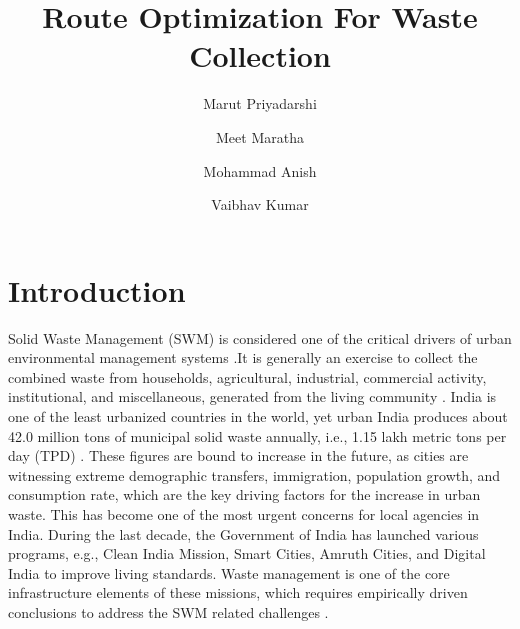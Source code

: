\documentclass[12pt]{article}
\begin{document}

\title{Route Optimization For Waste Collection\\}
\date{}
\author[1]{Marut Priyadarshi}
\author[2]{Meet Maratha}
\author[3]{Mohammad Anish}
\author[4]{Vaibhav Kumar}

\maketitle

\section{Introduction}

Solid Waste Management (SWM) is considered one of the critical drivers of urban environmental management systems \cite{hoornweg2012waste}.It is generally an exercise to collect the combined waste from households, agricultural, industrial, commercial activity, institutional, and miscellaneous, generated from the living community \cite{GUPTA2015206}. India is one of the least urbanized countries in the world, yet urban India produces about 42.0 million tons of municipal solid waste annually, i.e., 1.15 lakh metric tons per day (TPD) \cite{SHARMA2021293,GUPTA2015206}. These figures are bound to increase in the future, as cities are witnessing extreme demographic transfers, immigration, population growth, and consumption rate, which are the key driving factors for the increase in urban waste. This has become one of the most urgent concerns for local agencies in India. During the last decade, the Government of India has launched various programs, e.g., Clean India Mission, Smart Cities, Amruth Cities, and Digital India to improve living standards. Waste management is one of the core infrastructure elements of these missions, which requires empirically driven conclusions to address the SWM related challenges \cite{CHEELA2021419}. 
\end{document}
